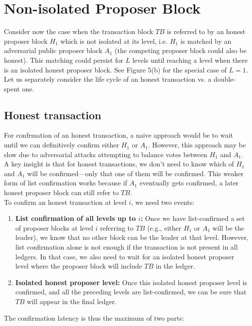 \section{Non-isolated Proposer Block}
Consider now the case when the transaction block $TB$ is referred to by an honest proposer block $H_{1}$  which is not isolated at its level, i.e. $H_{1}$ is matched by an adversarial public proposer block $A_{1}$ (the competing proposer block could also be honest). This matching could persist for $L$ levels until reaching a level when there is an isolated honest proposer block. See Figure 5(b) for the special  case of $L = 1$. Let us separately consider the life cycle of an honest transaction vs. a double-spent one.
\subsection{Honest transaction}
For confrmation of an honest transaction, a naive approach would be to wait until we can definitively confirm either $H_{1}$ or $A_{1}$. However, this approach may be slow due to adversarial attacks attempting to balance votes between $H_{1}$ and $A_{1}$. A key insight is that for honest transactions, we don't need to know which of $H_{1}$ and $A_{1}$ will be confirmed—only that one of them will be confirmed. This weaker form of list confirmation works because if $A_{1}$ eventually gets confirmed, a later honest proposer block can still refer to $TB$.\\
To confirm an honest transaction at level $i$, we need two events:
\begin{enumerate}
	\item \textbf{List confirmation of all levels up to $i$:} Once we have list-confirmed a set of proposer blocks at level $i$ referring to $TB$ (e.g., either $H_{1}$ or $A_{1}$ will be the leader), we know that no other block can be the leader at that level. However, list confirmation alone is not enough if the transaction is not present in all ledgers. In that case, we also need to wait for an isolated honest proposer level where the proposer block will include $TB$ in the ledger.
	\item \textbf{Isolated honest proposer level:} Once this isolated honest proposer level is confirmed, and all the preceding levels are list-confirmed, we can be sure that $TB$ will appear in the final ledger.
\end{enumerate}
The confirmation latency is thus the maximum of two parts:\\
